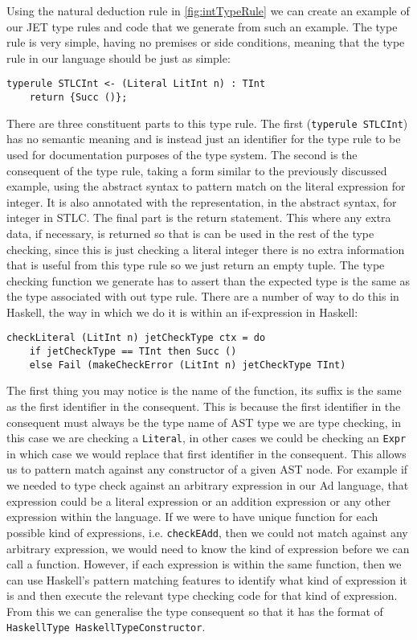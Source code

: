 Using the natural deduction rule in \autoref{fig:intTypeRule} we can create an example of our JET type rules and code that we generate from such an example.
The type rule is very simple, having no premises or side conditions, meaning that the type rule in our language should be just as simple:
\begin{lstlisting}[numbers=none]
typerule STLCInt <- (Literal LitInt n) : TInt 
    return {Succ ()};
\end{lstlisting}
There are three constituent parts to this type rule.
The first (\texttt{typerule STLCInt}) has no semantic meaning and is instead just an identifier for the type rule to be used for documentation purposes of the type system.
The second is the consequent of the type rule, taking a form similar to the previously discussed example, using the abstract syntax to pattern match on the literal expression for integer.
It is also annotated with the representation, in the abstract syntax, for integer in STLC.
The final part is the return statement.
This where any extra data, if necessary, is returned so that is can be used in the rest of the type checking, since this is just checking a literal integer there is no extra information that is useful from this type rule so we just return an empty tuple.
The type checking function we generate has to assert than the expected type is the same as the type associated with out type rule.
There are a number of way to do this in Haskell, the way in which we do it is within an if-expression in Haskell:
\begin{lstlisting}
checkLiteral (LitInt n) jetCheckType ctx = do
    if jetCheckType == TInt then Succ () 
    else Fail (makeCheckError (LitInt n) jetCheckType TInt)
\end{lstlisting}
The first thing you may notice is the name of the function, its suffix is the same as the first identifier in the consequent.
This is because the first identifier in the consequent must always be the type name of AST type we are type checking, in this case we are checking a \texttt{Literal}, in other cases we could be checking an \texttt{Expr} in which case we would replace that first identifier in the consequent.
This allows us to pattern match against any constructor of a given AST node. For example if we needed to type check against an arbitrary expression in our Ad language, that expression could be a literal expression or an addition expression or any other expression within the language.
If we were to have unique function for each possible kind of expressions, i.e. \texttt{checkEAdd}, then we could not match against any arbitrary expression, we would need to know the kind of expression before we can call a function.
However, if each expression is within the same function, then we can use Haskell's pattern matching features to identify what kind of expression it is and then execute the relevant type checking code for that kind of expression.
From this we can generalise the type consequent so that it has the format of \texttt{HaskellType HaskellTypeConstructor}.


